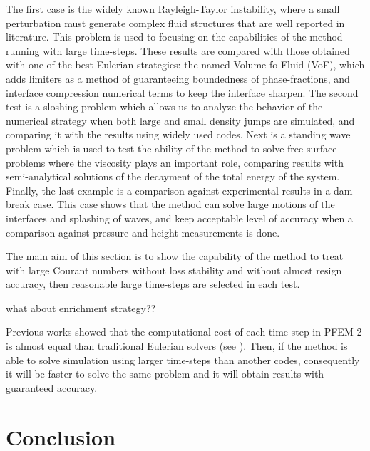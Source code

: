\documentclass[review]{elsarticle}
\begin{document}
The first case is the widely known Rayleigh-Taylor instability, where a small perturbation must generate complex fluid structures that are well reported in literature.
This problem is used to focusing on the capabilities of the method running with large time-steps. These results are compared with those obtained with one of the best Eulerian strategies: the named Volume fo Fluid (VoF), which adds limiters as a method of guaranteeing boundedness of phase-fractions, and interface compression numerical terms to keep the interface sharpen.
The second test is a sloshing problem which allows us to analyze the behavior of the numerical strategy when both large and small density jumps are simulated, and comparing it with the results using widely used codes. Next is a standing wave problem which is used to test the ability of the method to solve free-surface problems where the viscosity plays an important role, comparing results with semi-analytical solutions of the decayment of the total energy of the system.
Finally, the last example is a comparison against experimental results in a dam-break case.
This case shows that the method can solve large motions of the interfaces and splashing of waves, and keep acceptable level of accuracy when a comparison against pressure and height measurements is done.

The main aim of this section is to show the capability of the method to treat with large Courant numbers without loss stability and without almost resign accuracy, then reasonable large time-steps are selected in each test. 

what about enrichment strategy??

Previous works showed that the computational cost of each time-step in PFEM-2 is almost equal than traditional Eulerian solvers (see \cite{Idelsohn12b}\cite{Gimenez14}). Then, if the method is able to solve simulation using larger time-steps than another codes, consequently it will be faster to solve the same problem and it will obtain results with guaranteed accuracy.





% 


\section{Conclusion}
\end{document}
